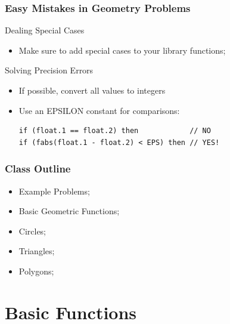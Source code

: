 \documentclass{beamer}
\begin{document}
\begin{frame}[fragile]
  \frametitle{Easy Mistakes in Geometry Problems}

  {\smaller
    
    \begin{block}{Dealing Special Cases}
      \begin{itemize}
      \item Make sure to add special cases to your
        library functions;
      \end{itemize}
    \end{block}
    
    \begin{block}{Solving Precision Errors}
      \begin{itemize}
      \item If possible, convert all values to integers
      \item Use an EPSILON constant for comparisons:
        
\begin{verbatim}
if (float.1 == float.2) then            // NO
if (fabs(float.1 - float.2) < EPS) then // YES!
\end{verbatim}

      \end{itemize}
    \end{block}
  }
\end{frame}

\begin{frame}
  \frametitle{Class Outline}
  \begin{itemize}
  \item Example Problems;
  \item Basic Geometric Functions;
  \item Circles;
  \item Triangles;
  \item Polygons;
  \end{itemize}
\end{frame}



\section{Basic Functions}
\end{document}
